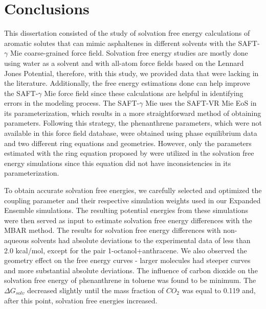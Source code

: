 \chapter{Conclusions} %

\label{Chapter6} 

This dissertation consisted of the study of solvation free energy calculations of aromatic solutes that can mimic asphaltenes in different solvents with the SAFT-$\gamma$ Mie coarse-grained force field. Solvation free energy studies are mostly done using water as a solvent and with all-atom force fields based on the Lennard Jones Potential, therefore, with this study, we provided data that were lacking in the literature. Additionally, the free energy estimations done can help improve the SAFT-$\gamma$  Mie force field since these calculations are helpful in identifying errors in the modeling process. The SAFT-$\gamma$ Mie uses the SAFT-VR Mie EoS in its parameterization, which results in a more straightforward method of obtaining parameters. Following this strategy, the phenanthrene parameters, which were not available in this force field database, were obtained using phase equilibrium data and two different ring equations and geometries. However, only the parameters estimated with the ring equation proposed by  were utilized in the solvation free energy simulations since this equation did not have inconsistencies in its parameterization.

To obtain accurate solvation free energies, we carefully selected and optimized the coupling parameter and their respective simulation weights used in our Expanded Ensemble simulations. The resulting potential energies from these simulations were then served as input to estimate solvation free energy differences with the MBAR method. The results for solvation free energy differences with non-aqueous solvents had absolute deviations to the experimental
data of less than 2.0 kcal/mol, except for the pair 1-octanol+anthracene. We also observed the geometry effect on the free energy curves - larger molecules had steeper curves and more substantial absolute deviations. The influence of carbon dioxide on the solvation free energy of phenanthrene in toluene was found to be minimum. The $\Delta G_{solv}$ decreased slightly until the mass fraction of $CO_{2}$ was equal to 0.119 and, after this point, solvation free energies increased. 

